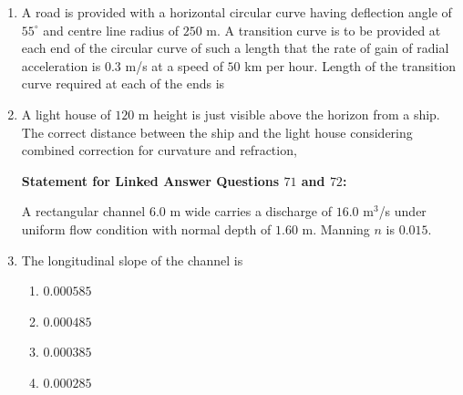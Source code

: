 \documentclass[journal]{IEEEtran}
\begin{document}
\begin{enumerate}
\item A road is provided with a horizontal circular curve having deflection angle of $55^\circ$ and centre line radius of $250$ m. A transition curve is to be provided at each end of the circular curve of such a length that the rate of gain of radial acceleration is $0.3$ m/s at a speed of $50$ km per hour. Length of the transition curve required at each of the ends is \hfill {}
\begin{enumerate}
\end{enumerate}

\item A light house of $120$ m height is just visible above the horizon from a ship. The correct distance  between the ship and the light house considering combined correction for curvature and refraction, \hfill {}
\begin{enumerate}
\end{enumerate}

\vspace{0.5cm}

\textbf{Statement for Linked Answer Questions $71$ and $72$:}


A rectangular channel $6.0$ m wide carries a discharge of $16.0$ m$^3$/s under uniform flow condition with normal depth of $1.60$ m. Manning $n$ is $0.015$. 

\vspace{0.5cm}

\item The longitudinal slope of the channel is \hfill {}

\begin{enumerate}
\item $0.000585$
\item $0.000485$
\item $0.000385$
\item $0.000285$
\end{enumerate}


\end{enumerate}
\end{document}
